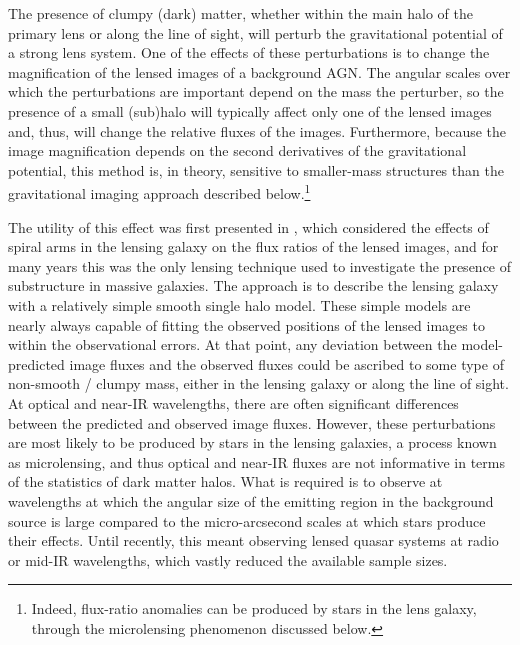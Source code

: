 \documentclass[modern,linenumbers]{aastex62}
\begin{document}
\vspace{1em} 

The presence of clumpy (dark) matter, whether within the main halo of the primary lens or along the line of sight, will perturb the gravitational potential of a strong lens system.
One of the effects of these perturbations is to change the magnification of the lensed images of a background AGN.
The angular scales over which the perturbations are important depend on the mass the perturber, so the presence of a small (sub)halo will typically affect only one of the lensed images and, thus, will change the relative fluxes of the images.
Furthermore, because the image magnification depends on the second derivatives of the gravitational potential, this method is, in theory, sensitive to smaller-mass structures than the gravitational imaging approach described below.\footnote{Indeed, flux-ratio anomalies can be produced by stars in the lens galaxy, through the microlensing phenomenon discussed below.}

The utility of this effect was first presented in \citet{Mao:1998aa}, which considered the effects of spiral arms in the lensing galaxy on the flux ratios of the lensed images, and for many years this was the only lensing technique used to investigate the presence of substructure in massive galaxies.
The approach is to describe the lensing galaxy with a relatively simple smooth single halo model.
These simple models are nearly always capable of fitting the observed positions of the lensed images to within the observational errors.
At that point, any deviation between the model-predicted image fluxes and the observed fluxes could be ascribed to some type of non-smooth / clumpy mass, either in the lensing galaxy or along the line of sight.
At optical and near-IR wavelengths, there are often significant differences between the predicted and observed image fluxes.
However, these perturbations are most likely to be produced by stars in the lensing galaxies, a process known as microlensing, and thus optical and near-IR fluxes are not informative in terms of the statistics of dark matter halos.
What is required is to observe at wavelengths at which the angular size of the emitting region in the background source is large compared to the micro-arcsecond scales at which stars produce their effects.  
Until recently, this meant observing lensed quasar systems at radio or mid-IR wavelengths, which vastly reduced the available sample sizes.
\end{document}
